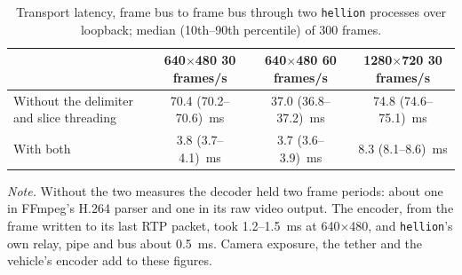 \documentclass[a4paper,fleqn]{cas-sc}
\newcommand{\hellion}{\texttt{hellion}}
\newcommand{\tablenote}[1]{\par\vspace{4pt}%
  \begin{minipage}{\linewidth}\footnotesize\textit{Note.} #1
\end{minipage}}
\begin{document}
\begin{table}[pos=htbp]
  \centering\small
  \caption{Transport latency, frame bus to frame bus through two \hellion{} processes
    over loopback; median (10th--90th percentile) of 300 frames.}\label{tab:latency}
  \begin{tabular}{@{}lccc@{}}
    \toprule
    & \makecell{640$\times$480\\30 frames/s} & \makecell{640$\times$480\\60 frames/s}
    & \makecell{1280$\times$720\\30 frames/s} \\
    \midrule
    Without the delimiter and slice threading & 70.4 (70.2--70.6)~ms & 37.0 (36.8--37.2)~ms & 74.8 (74.6--75.1)~ms \\
    With both & 3.8 (3.7--4.1)~ms & 3.7 (3.6--3.9)~ms & 8.3 (8.1--8.6)~ms \\
    \bottomrule
  \end{tabular}
  \tablenote{Without the two measures the decoder held two frame periods: about one in
    FFmpeg's H.264 parser and one in its raw video output. The encoder, from the frame
    written to its last RTP packet, took 1.2--1.5~ms at 640$\times$480, and \hellion{}'s
    own relay, pipe and bus about 0.5~ms. Camera exposure, the tether and the vehicle's
    encoder add to these figures.}
\end{table}
\end{document}
